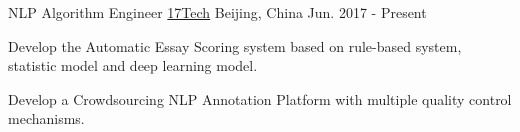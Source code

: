 

\begin{cventries}

  \cventry
    {NLP Algorithm Engineer} %
    {\href{https://www.17zuoye.com/help/aboutus.vpage}{17Tech}} %
    {Beijing, China} %
    {Jun. 2017 - Present} %
    {
      \begin{cvitems} %
        \item {Develop the Automatic Essay Scoring system based on rule-based system, statistic model and deep learning model.}
        \item {Develop a Crowdsourcing NLP Annotation Platform with multiple quality control mechanisms.}
      \end{cvitems}
    }



\end{cventries}